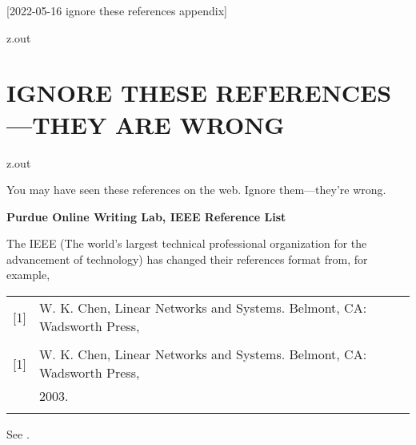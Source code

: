 [2022-05-16 ignore these references appendix]

\begin{VerbatimOut}{z.out}
\chapter{IGNORE THESE REFERENCES---THEY ARE WRONG}
\end{VerbatimOut}

\MyIO


\begin{VerbatimOut}{z.out}

You may have seen these references on the web.
Ignore them---they're wrong.

\noindent
\textbf{Purdue Online Writing Lab, IEEE Reference List}
\cite{owl}

The IEEE
(The world's largest technical professional organization
for the advancement
of technology)
has changed their references format from,
for example,

\noindent
\begin{tabular}{@{}ll@{}}
\noalign{\vspace*{6pt}}
  [1]& W. K. Chen, Linear Networks and Systems. Belmont, CA: Wadsworth Press,\\
  \multispan{2}{2003.\hfil}\\
\noalign{\vspace*{6pt}}
\noalign{\noindent to}
\noalign{\vspace*{6pt}}
  [1]& W. K. Chen, Linear Networks and Systems. Belmont, CA: Wadsworth Press,\\
  & 2003.\hfil\\
\noalign{\vspace*{6pt}}
\end{tabular}
See
\cite[page~2]{ieeedataport}.
\end{VerbatimOut}

\MyIO


% 
